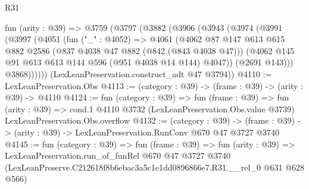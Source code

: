 \begin{lexlean}{R31}
\begin{coremodule}
  fun (arity : @39) =>
  @3759
    (@3797
      (@3882
        (@3906
          (@3943
            (@3974
              (@3991
                (@3997
                  (@4051
                    (fun ("_" : @4052) =>
                    @4061
                      (@4062
                        @87
                        @147
                        @613
                        @615
                        @882
                        @2586
                        (@837 @4038 @47 @882 (@842 (@843 @4038 @47)))
                        (@4062 @145 @91 @613 @613 @144 @596 (@951 @4038 @14 @144) @4047))
                      (@2691 @143)))
                  @3868))))))
      (LexLeanPreservation.construct_adt @47 @3794))
@4110 := LexLeanPreservation.Obs
@4113 := (category : @39) -> (frame : @39) -> (arity : @39) -> @4110
@4124 := fun (category : @39) =>
  fun (frame : @39) =>
  fun (arity : @39) =>
  cond.{1} @4110 @3732 (LexLeanPreservation.Obs.value @3739) LexLeanPreservation.Obs.overflow
@4132 := (category : @39) ->
  (frame : @39) -> (arity : @39) -> LexLeanPreservation.RunConv @670 @47 @3727 @3740
@4145 := fun (category : @39) =>
  fun (frame : @39) =>
  fun (arity : @39) =>
  LexLeanPreservation.run_of_funRel
    @670
    @47
    @3727
    @3740
    (LexLeanPreserve.C212618f8b6ebac3a5c1e1dd0896866e7.R31.__rel_0 @631 @628 @566)
\end{coremodule}
\end{lexlean}
